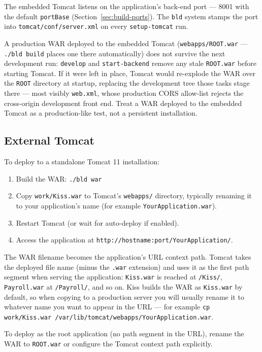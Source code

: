 \noindent
The embedded Tomcat listens on the application's back-end port --- 8001 with the default \texttt{portBase} (Section~\ref{sec:build-ports}).  The \texttt{bld} system stamps the port into \texttt{tomcat/conf/server.xml} on every \texttt{setup-tomcat} run.

\begin{notebox}
A production WAR deployed to the embedded Tomcat (\texttt{webapps/ROOT.war} --- \texttt{./bld build} places one there automatically) does not survive the next development run: \texttt{develop} and \texttt{start-backend} remove any stale \texttt{ROOT.war} before starting Tomcat.  If it were left in place, Tomcat would re-explode the WAR over the \texttt{ROOT} directory at startup, replacing the development tree those tasks stage there --- most visibly \texttt{web.xml}, whose production CORS allow-list rejects the cross-origin development front end.  Treat a WAR deployed to the embedded Tomcat as a production-like test, not a persistent installation.
\end{notebox}

\subsection{External Tomcat}

To deploy to a standalone Tomcat 11 installation:

\begin{enumerate}
  \item Build the WAR: \texttt{./bld war}
  \item Copy \texttt{work/Kiss.war} to Tomcat's \texttt{webapps/} directory, typically renaming it to your application's name (for example \texttt{YourApplication.war}).
  \item Restart Tomcat (or wait for auto-deploy if enabled).
  \item Access the application at \texttt{http://hostname:port/}\allowbreak\texttt{YourApplication/}.
\end{enumerate}

\begin{notebox}
The WAR filename becomes the application's URL context path.  Tomcat takes the deployed file name (minus the \texttt{.war} extension) and uses it as the first path segment when serving the application: \texttt{Kiss.war} is reached at \texttt{/Kiss/}, \texttt{Payroll.war} at \texttt{/Payroll/}, and so on.  Kiss builds the WAR as \texttt{Kiss.war} by default, so when copying to a production server you will usually rename it to whatever name you want to appear in the URL --- for example \texttt{cp work/Kiss.war /var/lib/tomcat/webapps/YourApplication.war}.

To deploy as the root application (no path segment in the URL), rename the WAR to \texttt{ROOT.war} or configure the Tomcat context path explicitly.
\end{notebox}

